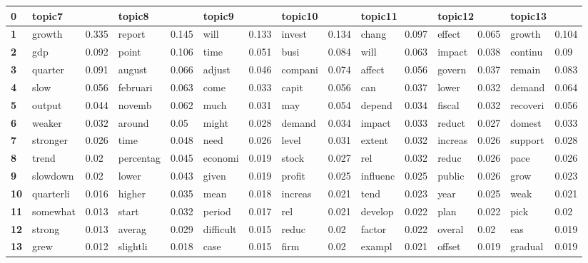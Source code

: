 \begin{tabular}{|l|l|l||l|l||l|l||l|l||l|l||l|l||l|l||}
\toprule
\textbf{0} & \multicolumn{2}{l}{topic7} & \multicolumn{2}{l}{topic8} & \multicolumn{2}{l}{topic9} & \multicolumn{2}{l}{topic10} & \multicolumn{2}{l}{topic11} & \multicolumn{2}{l}{topic12} & \multicolumn{2}{l}{topic13} \\
\midrule
\textbf{1 } &  growth &  0.335 &  report &  0.145 &  will &  0.133 &  invest &  0.134 &  chang &  0.097 &  effect &  0.065 &  growth &  0.104 \\
\textbf{2 } &  gdp &  0.092 &  point &  0.106 &  time &  0.051 &  busi &  0.084 &  will &  0.063 &  impact &  0.038 &  continu &  0.09 \\
\textbf{3 } &  quarter &  0.091 &  august &  0.066 &  adjust &  0.046 &  compani &  0.074 &  affect &  0.056 &  govern &  0.037 &  remain &  0.083 \\
\textbf{4 } &  slow &  0.056 &  februari &  0.063 &  come &  0.033 &  capit &  0.056 &  can &  0.037 &  lower &  0.032 &  demand &  0.064 \\
\textbf{5 } &  output &  0.044 &  novemb &  0.062 &  much &  0.031 &  may &  0.054 &  depend &  0.034 &  fiscal &  0.032 &  recoveri &  0.056 \\
\textbf{6 } &  weaker &  0.032 &  around &  0.05 &  might &  0.028 &  demand &  0.034 &  impact &  0.033 &  reduct &  0.027 &  domest &  0.033 \\
\textbf{7 } &  stronger &  0.026 &  time &  0.048 &  need &  0.026 &  level &  0.031 &  extent &  0.032 &  increas &  0.026 &  support &  0.028 \\
\textbf{8 } &  trend &  0.02 &  percentag &  0.045 &  economi &  0.019 &  stock &  0.027 &  rel &  0.032 &  reduc &  0.026 &  pace &  0.026 \\
\textbf{9 } &  slowdown &  0.02 &  lower &  0.043 &  given &  0.019 &  profit &  0.025 &  influenc &  0.025 &  public &  0.026 &  grow &  0.023 \\
\textbf{10} &  quarterli &  0.016 &  higher &  0.035 &  mean &  0.018 &  increas &  0.021 &  tend &  0.023 &  year &  0.025 &  weak &  0.021 \\
\textbf{11} &  somewhat &  0.013 &  start &  0.032 &  period &  0.017 &  rel &  0.021 &  develop &  0.022 &  plan &  0.022 &  pick &  0.02 \\
\textbf{12} &  strong &  0.013 &  averag &  0.029 &  difficult &  0.015 &  reduc &  0.02 &  factor &  0.022 &  overal &  0.02 &  eas &  0.019 \\
\textbf{13} &  grew &  0.012 &  slightli &  0.018 &  case &  0.015 &  firm &  0.02 &  exampl &  0.021 &  offset &  0.019 &  gradual &  0.019 \\

\end{tabular}
